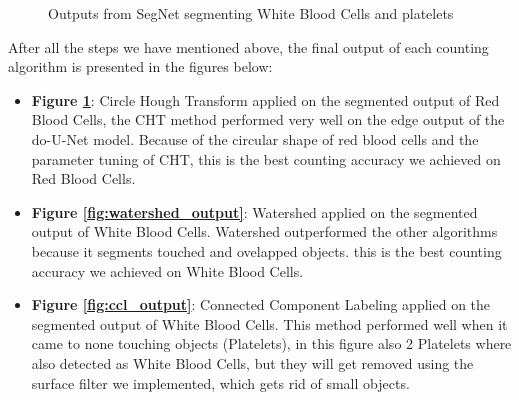 \begin{figure}[H]
\centering
\begin{minipage}{.5\textwidth}
  \centering
\end{minipage}%
\begin{minipage}{.5\textwidth}
  \centering
\end{minipage}
  \caption{Outputs from SegNet segmenting White Blood Cells and platelets}
  \label{fig:cht_output}
\end{figure}

After all the steps we have mentioned above, the final output of each counting algorithm is presented in the figures below:

\begin{itemize}
  \item \textbf{Figure \ref{fig:cht_output}}: Circle Hough Transform applied on the segmented output of Red Blood Cells, the CHT method performed very well on the edge output of the do-U-Net model.
    Because of the circular shape of red blood cells and the parameter tuning of CHT, this is the best counting accuracy we achieved on Red Blood Cells.
  \item \textbf{Figure \ref{fig:watershed_output}}: Watershed applied on the segmented output of White Blood Cells. Watershed outperformed the other algorithms because it segments touched and ovelapped objects. this is the best counting accuracy we achieved on White Blood Cells.
  \item \textbf{Figure \ref{fig:ccl_output}}: Connected Component Labeling applied on the segmented output of White Blood Cells. This method performed well when it came to none touching objects (Platelets), in this figure also 2 Platelets where also detected as White Blood Cells, but they will get removed using the surface filter we implemented, which gets rid of small objects.
\end{itemize}


